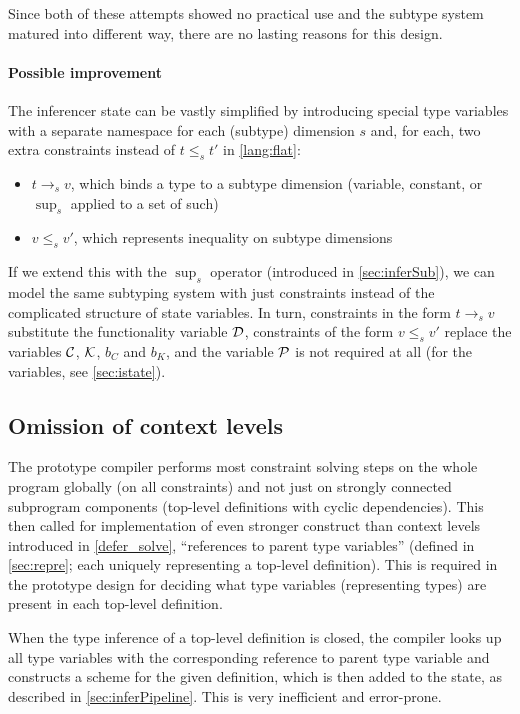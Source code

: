 Since both of these attempts showed no practical use and the subtype system matured into different way, there are no lasting reasons for this design.

\paragraph{Possible improvement} The inferencer state can be vastly simplified by introducing special type variables with a separate namespace for each (subtype) dimension $s$ and, for each, two extra constraints instead of $t \leq_s t'$ in \cref{lang:flat}:

\begin{itemize}
    \item $t \to_s v$, which binds a type to a subtype dimension (variable, constant, or $\sup_s$ applied to a set of such)
    \item $v \leq_s v'$, which represents inequality on subtype dimensions
\end{itemize}

If we extend this with the $\sup_s$ operator (introduced in \cref{sec:inferSub}), we can model the same subtyping system with just constraints instead of the complicated structure of state variables. In turn, constraints in the form $t \to_s v$ substitute the functionality variable $\mathcal D$, constraints of the form $v \leq_s v'$ replace the variables $\mathcal C$, $\mathcal K$, $b_C$ and $b_K$, and the variable $\mathcal P$ is not required at all (for the variables, see \cref{sec:istate}).

\subsection{Omission of context levels}
\label{sec:global}

The prototype compiler performs most constraint solving steps on the whole program globally (on all constraints) and not just on strongly connected subprogram components (top-level definitions with cyclic dependencies). This then called for implementation of even stronger construct than context levels introduced in \cref{defer_solve}, ``references to parent type variables'' (defined in \cref{sec:repre}; each uniquely representing a top-level definition). This is required in the prototype design for deciding what type variables (representing types) are present in each top-level definition.

When the type inference of a top-level definition is closed, the compiler looks up all type variables with the corresponding reference to parent type variable and constructs a scheme for the given definition, which is then added to the state, as described in \cref{sec:inferPipeline}. This is very inefficient and error-prone.

